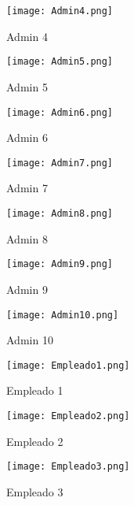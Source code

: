 \documentclass[12pt,a4paper, twosite]{article}
\begin{document}
\begin{figure}[h]
  \centering
  \texttt{[image: Admin4.png]}
  \caption{Admin 4}
\end{figure}
\begin{figure}[h]
  \centering
  \texttt{[image: Admin5.png]}
  \caption{Admin 5}
\end{figure}
\begin{figure}[h]
  \centering
  \texttt{[image: Admin6.png]}
  \caption{Admin 6}
\end{figure}
\begin{figure}[h]
  \centering
  \texttt{[image: Admin7.png]}
  \caption{Admin 7}
\end{figure}
\begin{figure}[h]
  \centering
  \texttt{[image: Admin8.png]}
  \caption{Admin 8}
\end{figure}
\begin{figure}[h]
  \centering
  \texttt{[image: Admin9.png]}
  \caption{Admin 9}
\end{figure}
\begin{figure}[h]
  \centering
  \texttt{[image: Admin10.png]}
  \caption{Admin 10}
\end{figure}
\begin{figure}[h]
  \centering
  \texttt{[image: Empleado1.png]}
  \caption{Empleado 1}
\end{figure}
\begin{figure}[h]
  \centering
  \texttt{[image: Empleado2.png]}
  \caption{Empleado 2}
\end{figure}
\begin{figure}[h]
  \centering
  \texttt{[image: Empleado3.png]}
  \caption{Empleado 3}
\end{figure}
\end{document}
